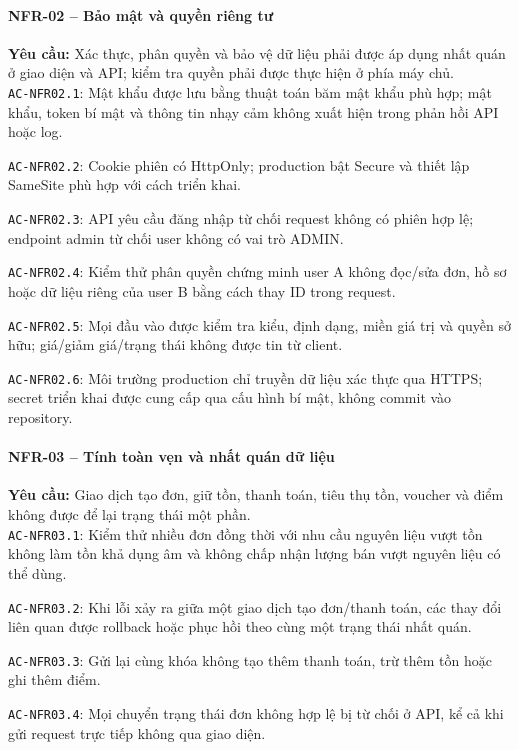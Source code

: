 \paragraph{NFR-02 -- Bảo mật và quyền riêng tư}
\textbf{Yêu cầu:} Xác thực, phân quyền và bảo vệ dữ liệu phải được áp dụng nhất quán ở giao diện và API; kiểm tra quyền phải được thực hiện ở phía máy chủ.\\
\noindent\texttt{AC-NFR02.1}: Mật khẩu được lưu bằng thuật toán băm mật khẩu phù hợp; mật khẩu, token bí mật và thông tin nhạy cảm không xuất hiện trong phản hồi API hoặc log.\par
\noindent\texttt{AC-NFR02.2}: Cookie phiên có HttpOnly; production bật Secure và thiết lập SameSite phù hợp với cách triển khai.\par
\noindent\texttt{AC-NFR02.3}: API yêu cầu đăng nhập từ chối request không có phiên hợp lệ; endpoint admin từ chối user không có vai trò ADMIN.\par
\noindent\texttt{AC-NFR02.4}: Kiểm thử phân quyền chứng minh user A không đọc/sửa đơn, hồ sơ hoặc dữ liệu riêng của user B bằng cách thay ID trong request.\par
\noindent\texttt{AC-NFR02.5}: Mọi đầu vào được kiểm tra kiểu, định dạng, miền giá trị và quyền sở hữu; giá/giảm giá/trạng thái không được tin từ client.\par
\noindent\texttt{AC-NFR02.6}: Môi trường production chỉ truyền dữ liệu xác thực qua HTTPS; secret triển khai được cung cấp qua cấu hình bí mật, không commit vào repository.\par

\paragraph{NFR-03 -- Tính toàn vẹn và nhất quán dữ liệu}
\textbf{Yêu cầu:} Giao dịch tạo đơn, giữ tồn, thanh toán, tiêu thụ tồn, voucher và điểm không được để lại trạng thái một phần.\\
\noindent\texttt{AC-NFR03.1}: Kiểm thử nhiều đơn đồng thời với nhu cầu nguyên liệu vượt tồn không làm tồn khả dụng âm và không chấp nhận lượng bán vượt nguyên liệu có thể dùng.\par
\noindent\texttt{AC-NFR03.2}: Khi lỗi xảy ra giữa một giao dịch tạo đơn/thanh toán, các thay đổi liên quan được rollback hoặc phục hồi theo cùng một trạng thái nhất quán.\par
\noindent\texttt{AC-NFR03.3}: Gửi lại cùng khóa không tạo thêm thanh toán, trừ thêm tồn hoặc ghi thêm điểm.\par
\noindent\texttt{AC-NFR03.4}: Mọi chuyển trạng thái đơn không hợp lệ bị từ chối ở API, kể cả khi gửi request trực tiếp không qua giao diện.\par

